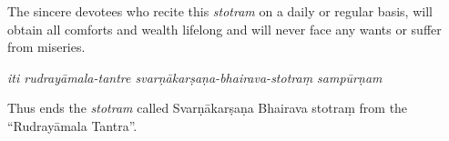 \documentclass[11pt,oneside,a4paper]{article}
\newenvironment{shloka}[1]
  {\bigskip\center#1\varwidth{\linewidth}}
  {\endvarwidth\endcenter\bigskip}
\newcommand{\tl}[1]{\emph{#1}}
\begin{document}
The sincere devotees who recite this \tl{stotram} on a daily or regular basis,
will obtain all comforts and wealth lifelong and will never face any wants or
suffer from miseries.

\begin{shloka}\itshape
  iti rudrayāmala-tantre svarṇākarṣaṇa-bhairava-stotraṃ sampūrṇam
\end{shloka}

Thus ends the \tl{stotram} called Svarṇākarṣaṇa Bhairava stotraṃ from the
``Rudrayāmala Tantra''.
\end{document}
